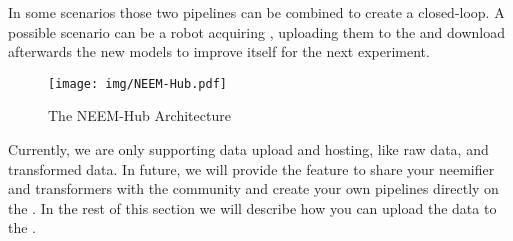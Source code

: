 In some scenarios those two pipelines can be combined to create a closed-loop. 
A possible scenario can be a robot acquiring \neems, uploading them to the \neemhub and download afterwards the new models to improve itself for the next experiment. 


\begin{figure}[h!]
	\centering
	\texttt{[image: img/NEEM-Hub.pdf]}
	\caption{The NEEM-Hub Architecture}
	\label{fig:neem-hub}
\end{figure} 


Currently, we are only supporting data upload and hosting, like raw data, \neems and transformed data.
In future, we will provide the feature to share your neemifier and transformers with the community and create your own pipelines directly on the \neemhub.
In the rest of this section we will describe how you can upload the data to the \neemhub.

